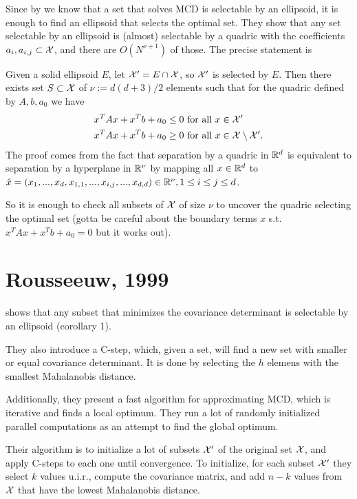 \documentclass{article}
\begin{document}
Since by \cite{rousseeuw1999fast} we know that a set that solves MCD is selectable by an ellipsoid, it is enough to find an ellipsoid that selects the optimal set. They show that any set selectable by an ellipsoid is (almost) selectable by a quadric with the coefficients $a_i, a_{i,j} \subset \mathcal{X}$, and there are $O(N^{\nu+1})$ of those. The precise statement is

\begin{theorem}
Given a solid ellipsoid $E$, let $\mathcal{X}' = E\cap \mathcal{X}$, so $\mathcal{X}'$ is selected by $E$. Then there exists set $S\subset \mathcal{X}$ of $\nu := d(d+3)/2$ elements such that for the quadric defined by $A, b, a_0$ we have
\begin{align*}
x^TAx + x^Tb + a_0 \leq 0 &\text{ for all $x\in \mathcal{X}'$}\\
x^TAx + x^Tb + a_0 \geq 0 &\text{ for all $x\in \mathcal{X}\setminus\mathcal{X}'$}.
\end{align*}
The proof comes from the fact that separation by a quadric in $\mathbb{R}^d$ is equivalent to separation by a hyperplane in $\mathbb{R}^\nu$ by mapping all $x\in \mathbb{R}^d$ to $\hat{x} = (x_1,...,x_d,x_{1,1},..., x_{i,j},...,x_{d,d})\in \mathbb{R}^\nu, 1\leq i\leq j \leq d$.

So it is enough to check all subsets of $\mathcal{X}$ of size $\nu$ to uncover the quadric selecting the optimal set (gotta be careful about the boundary terms $x$ s.t. $x^TAx + x^Tb + a_0 = 0$ but it works out).

\end{theorem}

\section{Rousseeuw, 1999}
\cite{rousseeuw1999fast} shows that any subset that minimizes the covariance determinant is selectable by an ellipsoid (corollary 1).

They also introduce a C-step, which, given a set, will find a new set with smaller or equal covariance determinant. It is done by selecting the $h$ elemens with the smallest Mahalanobis distance.

Additionally, they present a fast algorithm for approximating MCD, which is iterative and finds a local optimum. They run a lot of randomly initialized parallel computations as an attempt to find the global optimum.

Their algorithm is to initialize a lot of subsets $\mathcal{X}'$ of the original set $\mathcal{X}$, and apply C-steps to each one until convergence. To initialize, for each subset $\mathcal{X}'$ they select $k$ values u.i.r., compute the covariance matrix, and add $n-k$ values from $\mathcal{X}$ that have the lowest Mahalanobis distance.
\end{document}
